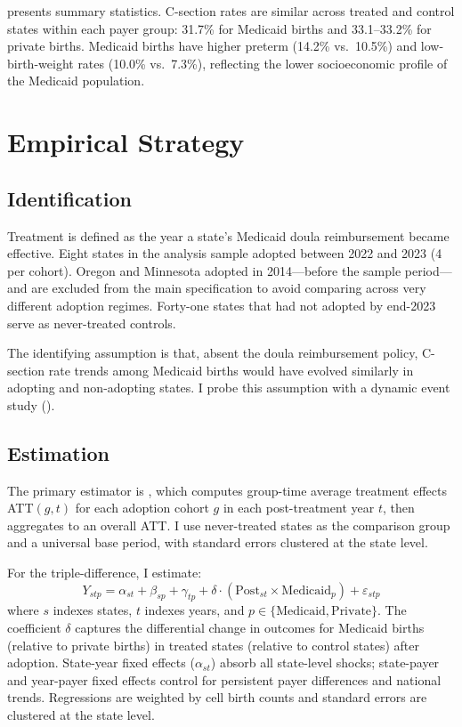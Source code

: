 \documentclass[12pt]{article}
\begin{document}
 presents summary statistics. C-section rates are similar across treated and control states within each payer group: 31.7\% for Medicaid births and 33.1--33.2\% for private births. Medicaid births have higher preterm (14.2\% vs.\ 10.5\%) and low-birth-weight rates (10.0\% vs.\ 7.3\%), reflecting the lower socioeconomic profile of the Medicaid population.




\section{Empirical Strategy}

\subsection{Identification}

Treatment is defined as the year a state's Medicaid doula reimbursement became effective. Eight states in the analysis sample adopted between 2022 and 2023 (4 per cohort). Oregon and Minnesota adopted in 2014---before the sample period---and are excluded from the main specification to avoid comparing across very different adoption regimes. Forty-one states that had not adopted by end-2023 serve as never-treated controls.

The identifying assumption is that, absent the doula reimbursement policy, C-section rate trends among Medicaid births would have evolved similarly in adopting and non-adopting states. I probe this assumption with a dynamic event study ().

\subsection{Estimation}

The primary estimator is \citet{callaway2021}, which computes group-time average treatment effects ATT$(g,t)$ for each adoption cohort $g$ in each post-treatment year $t$, then aggregates to an overall ATT. I use never-treated states as the comparison group and a universal base period, with standard errors clustered at the state level.

For the triple-difference, I estimate:
\begin{equation}
Y_{stp} = \alpha_{st} + \beta_{sp} + \gamma_{tp} + \delta \cdot (\text{Post}_{st} \times \text{Medicaid}_{p}) + \varepsilon_{stp}
\label{eq:ddd}
\end{equation}
where $s$ indexes states, $t$ indexes years, and $p \in \{\text{Medicaid}, \text{Private}\}$. The coefficient $\delta$ captures the differential change in outcomes for Medicaid births (relative to private births) in treated states (relative to control states) after adoption. State-year fixed effects ($\alpha_{st}$) absorb all state-level shocks; state-payer and year-payer fixed effects control for persistent payer differences and national trends. Regressions are weighted by cell birth counts and standard errors are clustered at the state level.
\end{document}
